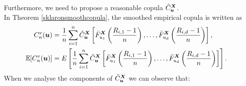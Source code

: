 \documentclass[12pt]{report}
\newcommand{\1}{\mathbf{1}}
\begin{document}
\begin{flushleft}
Furthermore, we need to propose a reasonable copula $\Tilde{C}_{\boldsymbol{u}}^{\boldsymbol{X}}$. \\
\vspace{0.5cm}
In Theorem \ref{sklaronsmoothcopula}, the smoothed empirical copula is written as
\begin{align*}
C_{n}^{v}(\boldsymbol{u}) &= \frac{1}{n} \sum\limits_{i = 1}^{n} \Tilde{C}_{\boldsymbol{u}}^{\boldsymbol{X}} \left[\Bar{F}_{u_{1}}^{\boldsymbol{X}}\left(\frac{R_{i,1} - 1}{n}\right), \dots, \Bar{F}_{u_{d}}^{\boldsymbol{X}}\left(\frac{R_{i,d} - 1}{n}\right) \right],\\
\mathbb{E}[C_{n}^{v}(\boldsymbol{u})] &= E \left[ \frac{1}{n} \sum\limits_{i = 1}^{n} \Tilde{C}_{\boldsymbol{u}}^{\boldsymbol{X}} \left[\Bar{F}_{u_{1}}^{\boldsymbol{X}}\left(\frac{R_{i,1} - 1}{n}\right), \dots, \Bar{F}_{u_{d}}^{\boldsymbol{X}}\left(\frac{R_{i,d} - 1}{n}\right) \right] \right].
\end{align*}
When we analyse the components of $\Tilde{C}_{\boldsymbol{u}}^{\boldsymbol{X}}$ \parencite{KojadinovicYi2024Smooth} we can observe that:


\end{flushleft}
\end{document}
